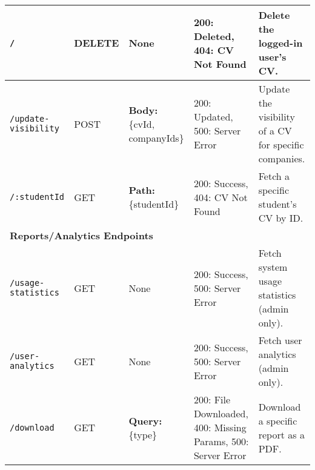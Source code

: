 \begin{landscape}
\begin{longtable}{|
  p{3cm}|
  p{1.6cm}|
  p{5.0cm}|
  p{5.0cm}|
  p{8.0cm}|
}
\texttt{/} &
DELETE &
None &
200: Deleted, 404: CV Not Found &
Delete the logged-in user's CV.\\ \hline

\texttt{/update-visibility} &
POST &
\textbf{Body:} \{cvId, companyIds\} &
200: Updated, 500: Server Error &
Update the visibility of a CV for specific companies.\\ \hline

\texttt{/:studentId} &
GET &
\textbf{Path:} \{studentId\} &
200: Success, 404: CV Not Found &
Fetch a specific student's CV by ID.\\ \hline

\multicolumn{5}{|l|}{\textbf{Reports/Analytics Endpoints}} \\ \hline

\texttt{/usage-statistics} &
GET &
None &
200: Success, 500: Server Error &
Fetch system usage statistics (admin only).\\ \hline

\texttt{/user-analytics} &
GET &
None &
200: Success, 500: Server Error &
Fetch user analytics (admin only).\\ \hline

\texttt{/download} &
GET &
\textbf{Query:} \{type\} &
200: File Downloaded, 400: Missing Params, 500: Server Error &
Download a specific report as a PDF.\\ \hline


\end{longtable}

\end{landscape}
